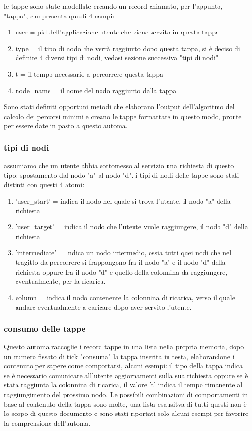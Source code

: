 le tappe sono state modellate creando un record chiamato, per l'appunto, "tappa", che presenta questi 4 campi:

\begin{enumerate}
	\item user = pid dell'applicazione utente che viene servito in questa tappa
	\item type = il tipo di nodo che verrà raggiunto dopo questa tappa, si è deciso di definire 4 diversi tipi di nodi, vedasi sezione successiva "tipi di nodi"
	\item t = il tempo necessario a percorrere questa tappa
	\item node\_name = il nome del nodo raggiunto dalla tappa
\end{enumerate}
Sono stati definiti opportuni metodi che elaborano l'output dell'algoritmo del calcolo dei percorsi minimi e creano le tappe formattate in questo modo, pronte per essere date in pasto a questo automa.

\subsubsection{tipi di nodi} \label{tipiTappe}

assumiamo che un utente abbia sottomesso al servizio una richiesta di questo tipo: spostamento dal nodo "a" al nodo "d".
i tipi di nodi delle tappe sono stati distinti con questi 4 atomi:

\begin{enumerate}
	\item 'user\_start' = indica il nodo nel quale si trova l'utente, il nodo "a" della richiesta
	\item 'user\_target' =  indica il nodo che l'utente vuole raggiungere, il nodo "d" della richiesta
	\item 'intermediate' =  indica un nodo intermedio, ossia tutti quei nodi che nel tragitto da percorrere si frappongono fra il nodo "a" e il nodo "d" della richiesta oppure fra il nodo "d" e quello della colonnina da raggiungere, eventualmente, per la ricarica.
	\item column = indica il nodo contenente la colonnina di ricarica, verso il quale andare eventualmente a caricare dopo aver servito l'utente.
\end{enumerate}

\subsubsection{consumo delle tappe} \label{consumo tappe}
Questo automa raccoglie i record tappe in una lista nella propria memoria, dopo un numero fissato di tick "consuma" la  tappa inserita in testa, elaborandone il contenuto per sapere come comportarsi, alcuni esempi: il tipo della tappa indica se è necessario comunicare all'utente aggiornamenti sulla sua richiesta oppure se è stata raggiunta la colonnina di ricarica, il valore 't' indica il tempo rimanente al raggiungimento del prossimo nodo.
Le possibili combinazioni di comportamenti in base al contenuto della tappa sono molte, una lista esausitva di tutti questi non è lo scopo di questo documento e sono stati riportati solo alcuni esempi per favorire la comprensione dell'automa.

